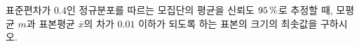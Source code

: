 표준편차가 $0.4$인 정규분포를 따르는 모집단의 평균을 신뢰도 $95\mkern3mu \%$로 추정할 때, 모평균 $m$과 표본평균 $\overline{x}$의 차가 $0.01$ 이하가 되도록 하는 표본의 크기의 최솟값을 구하시오. 
